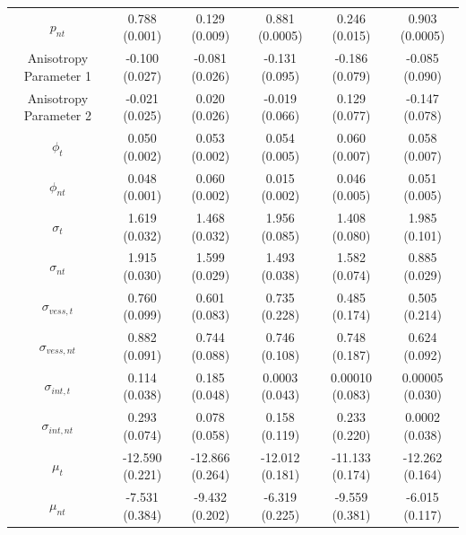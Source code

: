 \documentclass[12pt]{article}\usepackage[]{graphicx}\usepackage[]{color}
\begin{document}
\begin{longtable}[t]{cccccc}
\endfoot
\bottomrule
\endlastfoot
$p_{nt}$ & 0.788 (0.001) & 0.129 (0.009) & 0.881 (0.0005) & 0.246 (0.015) & 0.903 (0.0005)\\
Anisotropy Parameter 1 & -0.100 (0.027) & -0.081 (0.026) & -0.131 (0.095) & -0.186 (0.079) & -0.085 (0.090)\\
Anisotropy Parameter 2 & -0.021 (0.025) & 0.020 (0.026) & -0.019 (0.066) & 0.129 (0.077) & -0.147 (0.078)\\
$\phi_t$ & 0.050 (0.002) & 0.053 (0.002) & 0.054 (0.005) & 0.060 (0.007) & 0.058 (0.007)\\
$\phi_{nt}$ & 0.048 (0.001) & 0.060 (0.002) & 0.015 (0.002) & 0.046 (0.005) & 0.051 (0.005)\\
$\sigma_t$ & 1.619 (0.032) & 1.468 (0.032) & 1.956 (0.085) & 1.408 (0.080) & 1.985 (0.101)\\
$\sigma_{nt}$ & 1.915 (0.030) & 1.599 (0.029) & 1.493 (0.038) & 1.582 (0.074) & 0.885 (0.029)\\
$\sigma_{vess,t}$ & 0.760 (0.099) & 0.601 (0.083) & 0.735 (0.228) & 0.485 (0.174) & 0.505 (0.214)\\
$\sigma_{vess,nt}$ & 0.882 (0.091) & 0.744 (0.088) & 0.746 (0.108) & 0.748 (0.187) & 0.624 (0.092)\\
$\sigma_{int,t}$ & 0.114 (0.038) & 0.185 (0.048) & 0.0003 (0.043) & 0.00010 (0.083) & 0.00005 (0.030)\\
$\sigma_{int,nt}$ & 0.293 (0.074) & 0.078 (0.058) & 0.158 (0.119) & 0.233 (0.220) & 0.0002 (0.038)\\
$\mu_{t}$ & -12.590 (0.221) & -12.866 (0.264) & -12.012 (0.181) & -11.133 (0.174) & -12.262 (0.164)\\
$\mu_{nt}$ & -7.531 (0.384) & -9.432 (0.202) & -6.319 (0.225) & -9.559 (0.381) & -6.015 (0.117)\\*
\end{longtable}
\endgroup{}
\endgroup{}
\end{document}
